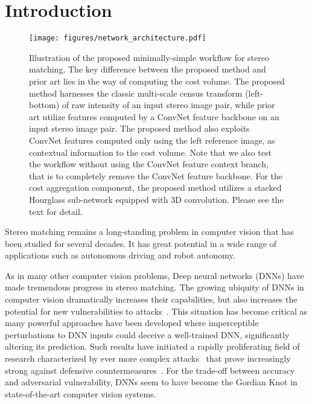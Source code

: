 \documentclass[10pt,twocolumn,letterpaper]{article}
\begin{document}
\section{Introduction}

\begin{figure*} [t]
\begin{center}
\texttt{[image: figures/network\_architecture.pdf]}
\end{center}
   \caption{Illustration of the proposed minimally-simple workflow for stereo matching. The key difference between the proposed method and prior art lies in the way of computing the cost volume. The proposed method harnesses the classic multi-scale census transform (left-bottom) of raw intensity of an input stereo image pair, while prior art utilize features computed by a ConvNet feature backbone on an input stereo image pair. The proposed method also exploits ConvNet features computed only using the left reference image, as contextual information to the cost volume. {Note that we also test the workflow without using the ConvNet feature context branch, that is to completely remove the ConvNet feature backbone.} For the cost aggregation component, the proposed method utilizes a stacked Hourglass sub-network equipped with 3D convolution. Please see the text for detail.}
\label{fig:model}
\end{figure*}

Stereo matching remains a long-standing problem in computer vision that has been studied for several decades. It has great potential in a wide range of applications such as autonomous driving and robot autonomy.  

As in many other computer vision problems, Deep neural networks (DNNs) have made tremendous progress in stereo matching. 
The growing ubiquity of DNNs in computer vision dramatically increases their capabilities, but also increases the potential for new vulnerabilities to attacks~\cite{Segmentation&DetectionAttack,GenerativeModelAttack,FaceAttack,HotFlip}. This situation has become critical as many powerful approaches have been developed where imperceptible perturbations to DNN inputs could deceive a well-trained DNN, significantly altering its prediction. Such results have initiated a rapidly proliferating field of research characterized by ever more complex attacks~\cite{FGSM, PGD, PracticalBlack-BoxAttacks,EnsembleAttack,TransferabilityAttack1, TransferabilityAttack2,AdvDistillation} that prove increasingly strong against defensive countermeasures~\cite{LogitPairing,FeatureDenoising,distillation_defense}. {For the trade-off between accuracy and adversarial vulnerability, DNNs seem to have become the Gordian Knot in state-of-the-art computer vision systems.} 
\end{document}
